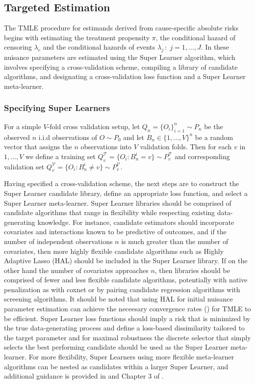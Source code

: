 \documentclass{report}
\newcommand{\1}{\ensuremath{\mathbf{1}}}
\newcommand{\g}{\ensuremath{\pi}}
\begin{document}
\subsection{Targeted Estimation}
\label{estimation}
The TMLE procedure for estimands derived from cause-specific absolute risks begins with estimating the treatment propensity \(\g\), the conditional hazard of censoring \(\lambda_c\) and the conditional hazards of events \(\lambda_j \,:\; j = 1, \dots, J\). In  these nuisance parameters are estimated using the Super Learner algorithm, which involves specifying a cross-validation scheme, compiling a library of candidate algorithms, and designating a cross-validation loss function and a Super Learner meta-learner.

\subsubsection{Specifying Super Learners}
\label{cv}
For a simple \(V\text{-fold}\) cross validation setup, let 
\(Q_n = \{O_i\}_{i=1}^n \sim P_n\) 
be the observed \(n\) i.i.d observations of \(O \sim P_0\) and let
\(B_n \in \{1, ... , V\}^n\)
be a random vector that assigns the \(n\) observations into \(V\) validation folds. Then for each \(v\) in \(1, ..., V\) we define a training set 
\(Q^\mathcal{T}_v = \{O_i : B_n^i = v\} \sim  P^\mathcal{T}_v\)
and corresponding validation set
\(Q^\mathcal{V}_v = \{O_i : B_n^i \neq v\} \sim P^\mathcal{V}_v\).

Having specified a cross-validation scheme, the next steps are to construct the Super Learner candidate library, define an appropriate loss function, and select a Super Learner meta-learner. Super Learner libraries should be comprised of candidate algorithms that range in flexibility while respecting existing data-generating knowledge. For instance, candidate estimators should incorporate covariates and interactions known to be predictive of outcomes, and if the number of independent observations \(n\) is much greater than the number of covariates, then more highly flexible candidate algorithms such as Highly Adaptive Lasso (HAL) should be included in the Super Learner library. If on the other hand the number of covariates approaches \(n\), then libraries should be comprised of fewer and less flexible candidate algorithms, potentially with native penalization as with coxnet or by pairing candidate regression algorithms with screening algorithms. It should be noted that using HAL for initial nuisance parameter estimation can achieve the neceesary convergence rates (\cite{laan_generally_2017,benkeser_highly_2016,rytgaard_continuous-time_2021}) for TMLE to be efficient. Super Learner loss functions should imply a risk that is minimized by the true data-generating process and define a loss-based dissimilarity tailored to the target parameter and for maximal robustness the discrete selector that simply selects the best performing candidate should be used as the Super Learner meta-learner. For more flexibility, Super Learners using more flexible meta-learner algorithms can be nested as candidates within a larger Super Learner, and additional guidance is provided in \cite{laan_super_2007} and Chapter 3 of \cite{laan_targeted_2011}.
\end{document}
